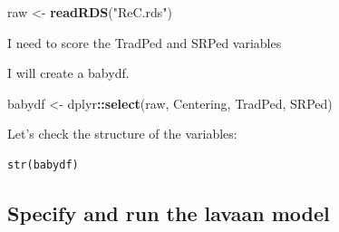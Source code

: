 \documentclass[
  11pt,
]{book}
\newenvironment{Shaded}{\begin{snugshade}}{\end{snugshade}}
\newcommand{\FloatTok}[1]{\textcolor[rgb]{0.06,0.06,0.06}{#1}}
\newcommand{\FunctionTok}[1]{\textcolor[rgb]{0.27,0.27,0.27}{\textbf{#1}}}
\newcommand{\NormalTok}[1]{#1}
\newcommand{\OtherTok}[1]{\textcolor[rgb]{0.37,0.37,0.37}{#1}}
\newcommand{\SpecialCharTok}[1]{\textcolor[rgb]{0.43,0.43,0.43}{\textbf{#1}}}
\newcommand{\StringTok}[1]{\textcolor[rgb]{0.5,0.5,0.5}{#1}}
\begin{document}
\begin{Shaded}
\begin{Highlighting}[]
\NormalTok{raw }\OtherTok{\textless{}{-}} \FunctionTok{readRDS}\NormalTok{(}\StringTok{"ReC.rds"}\NormalTok{)}
\end{Highlighting}
\end{Shaded}

I need to score the TradPed and SRPed variables

\begin{Shaded}
\end{Shaded}

I will create a babydf.

\begin{Shaded}
\begin{Highlighting}[]
\NormalTok{babydf }\OtherTok{\textless{}{-}}\NormalTok{ dplyr}\SpecialCharTok{::}\FunctionTok{select}\NormalTok{(raw, Centering, TradPed, SRPed)}
\end{Highlighting}
\end{Shaded}

Let's check the structure of the variables:

\begin{verbatim}
str(babydf)
\end{verbatim}

\hypertarget{specify-and-run-the-lavaan-model}{%
\subsection*{Specify and run the lavaan model}\label{specify-and-run-the-lavaan-model}}
\end{document}
